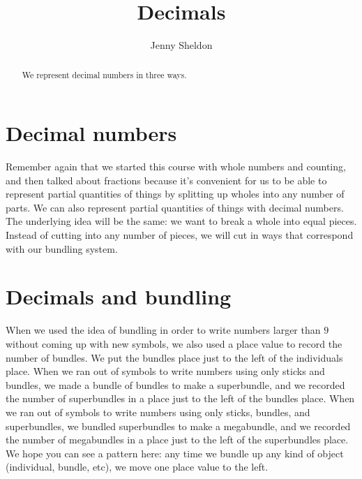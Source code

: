 \documentclass{ximera}
\title{Decimals}
\author{Jenny Sheldon}
\begin{document}
\begin{abstract}
We represent decimal numbers in three ways.
\end{abstract}
\maketitle


\section{Decimal numbers}

Remember again that we started this course with whole numbers and counting, and then talked about fractions because it's convenient for us to be able to represent partial quantities of things by splitting up wholes into any number of parts. We can also represent partial quantities of things with decimal numbers. The underlying idea will be the same: we want to break a whole  into equal pieces. Instead of cutting into any number of pieces, we will cut in ways that correspond with our bundling system.



\section{Decimals and bundling}

When we used the idea of bundling in order to write numbers larger than $9$ without coming up with new symbols, we also used a place value to record the number of bundles. We put the bundles place just to the left of the individuals place. When we ran out of symbols to write numbers using only sticks and bundles, we made a bundle of bundles to make a superbundle, and we recorded the number of superbundles in a place just to the left of the bundles place. When we ran out of symbols to write numbers using only sticks, bundles, and superbundles, we bundled superbundles to make a megabundle, and we recorded the number of megabundles in a place just to the left of the superbundles place.  We hope you can see a pattern here: any time we bundle up any kind of object (individual, bundle, etc), we move one place value to the left. %
\end{document}
